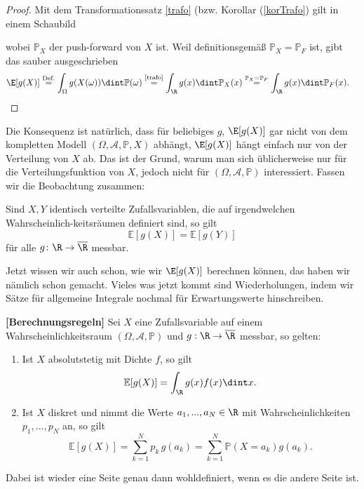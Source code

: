 \begin{proof}
	Mit dem Transformationssatz \ref{trafo} (bzw. Korollar (\ref{korTrafo}) gilt in einem Schaubild 
\begin{center}		
\end{center}
wobei $\mathbb P_X$ der push-forward von $X$ ist. Weil definitionsgem\"a\ss{} $\mathbb P_X=\mathbb P_F$ ist, gibt das sauber ausgeschrieben
\begin{align*}
	\E[g(X)] &\overset{\text{Def.}}{=} \int_{\Omega} g(X(\omega)) \dint \mathbb{P}(\omega)
	 \overset{\text{\ref{trafo}}}{=} \int_{\R} g(x) \dint \mathbb{P}_X(x)
	 \overset{\mathbb P_X=\mathbb P_F}{=} \int_{\R} g(x) \dint \mathbb{P}_F(x).
\end{align*}
\end{proof}
Die Konsequenz ist nat\"urlich, dass f\"ur beliebiges $g$, $\E[g(X)]$ gar nicht von dem kompletten Modell $(\Omega, \mathcal A, \mathbb P,X)$ abh\"angt, $\E[g(X)]$ h\"angt einfach nur von der Verteilung von $X$ ab. Das ist der Grund, warum man sich \"ublicherweise nur f\"ur die Verteilungsfunktion von $X$, jedoch nicht f\"ur $(\Omega, \mathcal A, \mathbb P)$ interessiert. Fassen wir die Beobachtung zusammen:
\begin{bem1}
	Sind $X, Y$ identisch verteilte Zufallsvariablen, die auf irgendwelchen Wahrscheinlich-keitsräumen definiert sind, so gilt
		\[ \mathbb{E}[g(X)] = \mathbb{E}[g(Y)] \] für alle $g \colon \R \to \overline{\R}$ messbar.
\end{bem1}
Jetzt wissen wir auch schon, wie wir $\E[g(X)]$ berechnen k\"onnen, das haben wir n\"amlich schon gemacht. Vieles was jetzt kommt sind Wiederholungen, indem wir S\"atze f\"ur allgemeine Integrale nochmal f\"ur Erwartungswerte hinschreiben.
\begin{satz}\label{regeln}
 \textbf{[Berechnungsregeln]}
	Sei $X$ eine Zufallsvariable auf einem Wahrscheinlichkeitsraum $(\Omega, \mathcal A, \mathbb P)$ und $g:\R\to \overline{\R}$ messbar, so gelten:
	\begin{enumerate}[label=(\roman*)]
		\item\label{(i)} Ist $X$ absolutstetig mit Dichte $f$, so gilt \[ \mathbb{E}[g(X)] = \int_{\R} g(x) f(x) \dint x. \]
		\item\label{ii} Ist $X$ diskret und nimmt die Werte $a_1, ..., a_N\in\R$ mit Wahrscheinlichkeiten $p_1, ..., p_N$ an, so gilt
		 \[ \mathbb{E}[g(X)] = \sum\limits_{k=1}^{N} p_k\, g(a_k)=  \sum\limits_{k=1}^{N}  \mathbb{P}(X=a_k)g(a_k). \]
	\end{enumerate}
	 Dabei ist wieder eine Seite genau dann wohldefiniert, wenn es die andere Seite ist.
\end{satz}
